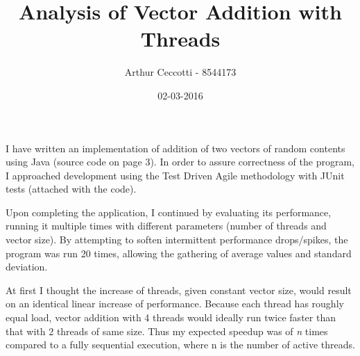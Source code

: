 \documentclass{article}
\title{Analysis of Vector Addition with Threads}
\date{02-03-2016}
\author{Arthur Ceccotti - 8544173}
\begin{document}
  \maketitle

  I have written an implementation of addition of two vectors of random contents using Java (source code on page 3).
  In order to assure correctness of the program, I approached development using the Test Driven Agile methodology with JUnit tests (attached with the code).

  Upon completing the application, I continued by evaluating its performance, running it multiple times with different parameters (number of threads and vector size).
  By attempting to soften intermittent performance drops/spikes, the program was run 20 times, allowing the gathering of average values and standard deviation.

  At first I thought the increase of threads, given constant vector size, would result on an identical linear increase of performance. Because each thread has roughly equal load, vector addition with 4 threads would ideally run twice faster than that with 2 threads of same size. Thus my expected speedup was of \textit{n} times compared to a fully sequential execution, where n is the number of active threads.
\end{document}
